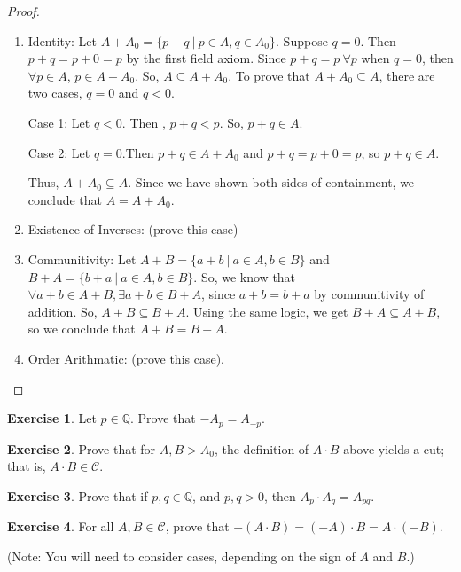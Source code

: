 \documentclass{article}
\theoremstyle{definition}
\newtheorem{exercise}{Exercise}
\newcommand{\Q}{\mathbb{Q}}
\begin{document}
\begin{proof}
\begin{enumerate}
\item Identity: Let $A + A_0 = \{p + q\ |\ p \in A, q \in A_0\}$. Suppose $q = 0$. Then $p + q = p + 0 = p$ by the first field axiom. Since $ p + q = p\ \forall p$ when $q = 0$, then $\forall p \in A$, $p \in A + A_0$. So, $ A \subseteq A + A_0$. To prove that $A + A_0 \subseteq A$, there are two cases, $q = 0$ and $q < 0$. 

Case 1: Let $q < 0$. Then , $p + q < p$. So, $p + q \in A$. 


Case 2: Let $q = 0$.Then $p + q \in A + A_0$ and $p + q = p + 0 = p$, so $p + q \in A$. 

Thus, $A + A_0 \subseteq A$. Since we have shown both sides of containment, we conclude that $ A = A+ A_0$. 
\item Existence of Inverses: (prove this case)
\item Communitivity: Let $A + B = \{ a + b\ |\ a \in A, b \in B\}$ and $B + A = \{ b + a\ |\ a \in A, b \in B\}$. So, we know that $\forall a + b \in A + B, \exists a + b \in B + A$, since $a + b = b + a$ by communitivity of addition. So, $A + B \subseteq B + A$. Using the same logic, we get $B + A \subseteq A + B$, so we conclude that $ A + B = B + A$. 
\item Order Arithmatic: (prove this case).
\end{enumerate}
\end{proof}

\begin{exercise}
Let $p\in \Q$. Prove that $-A_p=A_{-p}$.
\end{exercise}

\begin{exercise}
Prove that for $A, B> A_0$, the definition of $A\cdot B$ above yields a cut; that is, $A\cdot B\in \mathcal{C}$.
\end{exercise}

\begin{exercise}
Prove that if $p, q\in \Q$, and $p, q> 0$, then $A_p\cdot A_q = A_{pq}$.
\end{exercise}

\begin{exercise}\label{negmove}
For all $A, B\in \mathcal{C}$, prove that $-(A\cdot B) = (-A)\cdot B=A\cdot(-B)$.

(Note: You will need to consider cases, depending on the sign of $A$ and $B$.)
\end{exercise}
\end{document}
